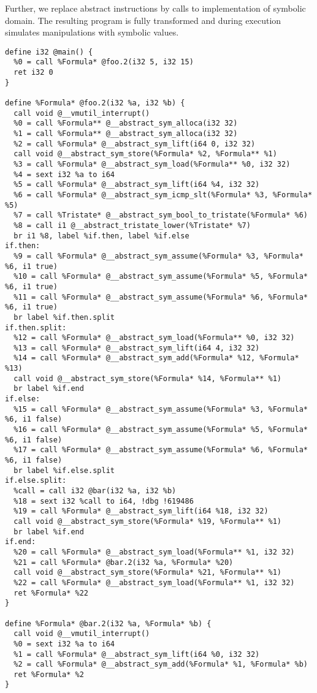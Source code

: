 \newpage
\noindent
Further, we replace abstract instructions by calls to implementation of
symbolic domain. The resulting program is fully transformed and during execution
simulates manipulations with symbolic values.

\begin{verbatim}
define i32 @main() {
  %0 = call %Formula* @foo.2(i32 5, i32 15)
  ret i32 0
}

define %Formula* @foo.2(i32 %a, i32 %b) {
  call void @__vmutil_interrupt()
  %0 = call %Formula** @__abstract_sym_alloca(i32 32)
  %1 = call %Formula** @__abstract_sym_alloca(i32 32)
  %2 = call %Formula* @__abstract_sym_lift(i64 0, i32 32)
  call void @__abstract_sym_store(%Formula* %2, %Formula** %1)
  %3 = call %Formula* @__abstract_sym_load(%Formula** %0, i32 32)
  %4 = sext i32 %a to i64
  %5 = call %Formula* @__abstract_sym_lift(i64 %4, i32 32)
  %6 = call %Formula* @__abstract_sym_icmp_slt(%Formula* %3, %Formula* %5)
  %7 = call %Tristate* @__abstract_sym_bool_to_tristate(%Formula* %6)
  %8 = call i1 @__abstract_tristate_lower(%Tristate* %7)
  br i1 %8, label %if.then, label %if.else
if.then:
  %9 = call %Formula* @__abstract_sym_assume(%Formula* %3, %Formula* %6, i1 true)
  %10 = call %Formula* @__abstract_sym_assume(%Formula* %5, %Formula* %6, i1 true)
  %11 = call %Formula* @__abstract_sym_assume(%Formula* %6, %Formula* %6, i1 true)
  br label %if.then.split
if.then.split:
  %12 = call %Formula* @__abstract_sym_load(%Formula** %0, i32 32)
  %13 = call %Formula* @__abstract_sym_lift(i64 4, i32 32)
  %14 = call %Formula* @__abstract_sym_add(%Formula* %12, %Formula* %13)
  call void @__abstract_sym_store(%Formula* %14, %Formula** %1)
  br label %if.end
if.else:
  %15 = call %Formula* @__abstract_sym_assume(%Formula* %3, %Formula* %6, i1 false)
  %16 = call %Formula* @__abstract_sym_assume(%Formula* %5, %Formula* %6, i1 false)
  %17 = call %Formula* @__abstract_sym_assume(%Formula* %6, %Formula* %6, i1 false)
  br label %if.else.split
if.else.split:
  %call = call i32 @bar(i32 %a, i32 %b)
  %18 = sext i32 %call to i64, !dbg !619486
  %19 = call %Formula* @__abstract_sym_lift(i64 %18, i32 32)
  call void @__abstract_sym_store(%Formula* %19, %Formula** %1)
  br label %if.end
if.end:
  %20 = call %Formula* @__abstract_sym_load(%Formula** %1, i32 32)
  %21 = call %Formula* @bar.2(i32 %a, %Formula* %20)
  call void @__abstract_sym_store(%Formula* %21, %Formula** %1)
  %22 = call %Formula* @__abstract_sym_load(%Formula** %1, i32 32)
  ret %Formula* %22
}

define %Formula* @bar.2(i32 %a, %Formula* %b) {
  call void @__vmutil_interrupt()
  %0 = sext i32 %a to i64
  %1 = call %Formula* @__abstract_sym_lift(i64 %0, i32 32)
  %2 = call %Formula* @__abstract_sym_add(%Formula* %1, %Formula* %b)
  ret %Formula* %2
}
\end{verbatim}
\areaset[current]{312pt}{657pt}
\setlength{\marginparwidth}{7.5em}%
\setlength{\marginparsep}{2em}%

